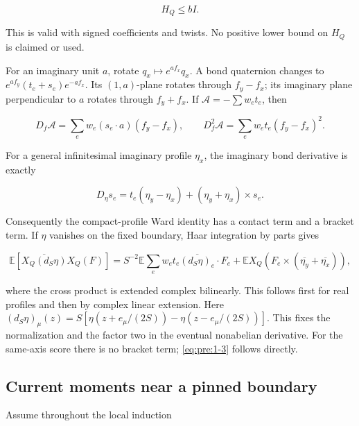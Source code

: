 \begin{equation}
H_Q\leq bI.
\label{eq:pre:1-2}
\end{equation}

This is valid with signed coefficients and twists. No positive lower bound on \(H_Q\) is claimed or used.

For an imaginary unit \(a\), rotate \(q_x\mapsto e^{af_x}q_x\). A bond quaternion changes to \(e^{af_y}(t_e+s_e)e^{-af_x}\). Its \((1,a)\)-plane rotates through \(f_y-f_x\); its imaginary plane perpendicular to \(a\) rotates through \(f_y+f_x\). If \(\mathcal A=-\sum w_et_e\), then

\begin{equation}
 D_f\mathcal A=\sum_e w_e(s_e\cdot a)(f_y-f_x),\qquad
 D_f^2\mathcal A=\sum_e w_et_e(f_y-f_x)^2.
\label{eq:pre:1-3}
\end{equation}

For a general infinitesimal imaginary profile \(\eta_x\), the imaginary bond derivative is exactly

\begin{equation}
D_\eta s_e=t_e(\eta_y-\eta_x)+(\eta_y+\eta_x)\times s_e.
\label{eq:pre:1-4}
\end{equation}

Consequently the compact-profile Ward identity has a contact term and a bracket term. If \(\eta\) vanishes on the fixed boundary, Haar integration by parts gives

\begin{equation}
\mathbb E[\overline{X_Q(d_S\eta)}X_Q(F)]
=S^{-2}\mathbb E\sum_e w_et_e\overline{(d_S\eta)_e}\cdot F_e
+\mathbb E X_Q\!\left(F_e\times(\overline{\eta_y}+\overline{\eta_x})\right),
\label{eq:pre:1-5}
\end{equation}

where the cross product is extended complex bilinearly. This follows first
for real profiles and then by complex linear extension. Here
\((d_S\eta)_\mu(z)=S[\eta(z+e_\mu/(2S))-\eta(z-e_\mu/(2S))]\).
This fixes the normalization and the factor two in the eventual nonabelian derivative. For the same-axis score there is no bracket term; \eqref{eq:pre:1-3} follows directly.


\subsection{Current moments near a pinned boundary}\label{pre:moments}

Assume throughout the local induction

